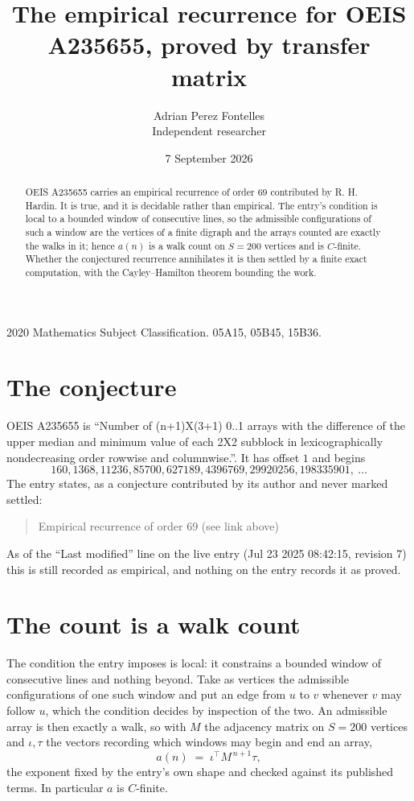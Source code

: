 \documentclass[11pt,a4paper]{article}
\title{The empirical recurrence for OEIS A235655, proved by transfer matrix}
\author{Adrian Perez Fontelles\\ \small Independent researcher}
\date{7 September 2026}
\theoremstyle{plain}
\theoremstyle{definition}
\begin{document}
\maketitle

\begin{abstract}
OEIS A235655 carries an empirical recurrence of order $69$ contributed by R. H. Hardin. It is
true, and it is decidable rather than empirical. The entry's condition is local to a bounded window of consecutive lines, so
the admissible configurations of such a window are the vertices of a finite digraph and the
arrays counted are exactly the walks in it; hence $a(n)$ is a walk count on $S=200$ vertices
and is $C$-finite. Whether the conjectured recurrence annihilates it is then settled by a
finite exact computation, with the Cayley--Hamilton theorem bounding the work.
\end{abstract}

\noindent\small 2020 Mathematics Subject Classification. 05A15, 05B45, 15B36.\normalsize

\section{The conjecture}

OEIS A235655 is ``Number of (n+1)X(3+1) 0..1 arrays with the difference of the upper median and minimum value of each 2X2 subblock in lexicographically nondecreasing order rowwise and columnwise.''. It has offset $1$ and begins
\[
160, 1368, 11236, 85700, 627189, 4396769, 29920256, 198335901,\ \dots
\]
The entry states, as a conjecture contributed by its author and never marked settled:
\begin{quote}
Empirical recurrence of order 69 (see link above)
\end{quote}
As of the ``Last modified'' line on the live entry (Jul 23 2025 08:42:15, revision 7) this is still
recorded as empirical, and nothing on the entry records it as proved.

\section{The count is a walk count}

The condition the entry imposes is local: it constrains a bounded window of consecutive lines and nothing beyond. Take as
vertices the admissible configurations of one such window and put an edge from $u$ to $v$
whenever $v$ may follow $u$, which the condition decides by inspection of the two. An
admissible array is then exactly a walk, so with $M$ the adjacency matrix on $S=200$ vertices
and $\iota,\tau$ the vectors recording which windows may begin and end an array,
\[
a(n)\;=\;\iota^{\!\top}M^{\,n+1}\tau ,
\]
the exponent fixed by the entry's own shape and checked against its published terms. In
particular $a$ is $C$-finite.
\end{document}
